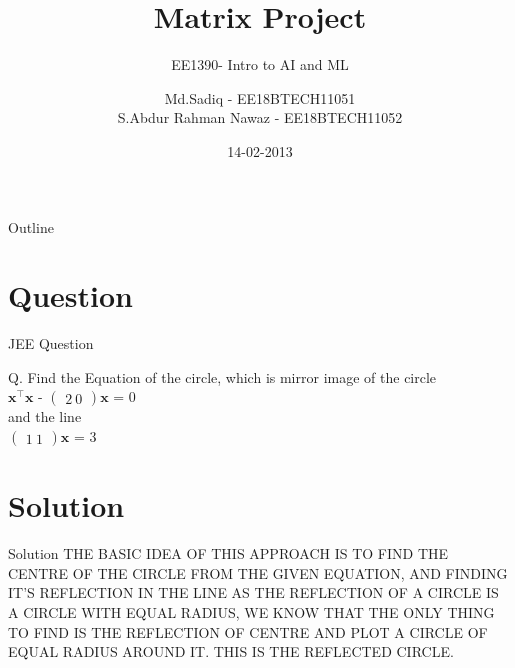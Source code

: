\documentclass{beamer}
\title{Matrix Project}
\subtitle{EE1390- Intro to AI and ML}
\author[]{Md.Sadiq - EE18BTECH11051 
\\
S.Abdur Rahman Nawaz - EE18BTECH11052}
\date{14-02-2013}
\begin{document}
\begin{frame}
  \titlepage
\end{frame}

\begin{frame}{Outline}
  \tableofcontents
\end{frame}

\section{Question}

\begin{frame}{JEE Question}
 
 
   Q. Find the Equation of the circle, which is mirror image of the circle\\
$\mathbf{x}^\intercal \mathbf{x}$ - $\begin{pmatrix} 2\ 0 \end{pmatrix}\mathbf{x}$ = 0
\\and the line\\
$\begin{pmatrix} 1\ 1 \end{pmatrix}\mathbf{x}$ = 3
\end{frame}

\section{Solution}
\begin{frame}{Solution}
THE BASIC IDEA OF THIS APPROACH IS TO FIND THE CENTRE OF THE CIRCLE
 FROM THE GIVEN EQUATION, AND FINDING IT'S REFLECTION IN THE LINE
 AS THE REFLECTION OF A CIRCLE IS A CIRCLE WITH EQUAL RADIUS, WE KNOW
 THAT THE ONLY THING TO FIND IS THE REFLECTION OF CENTRE AND PLOT A
 CIRCLE OF EQUAL RADIUS AROUND IT. THIS IS THE REFLECTED CIRCLE.
\end{frame}
\end{document}
